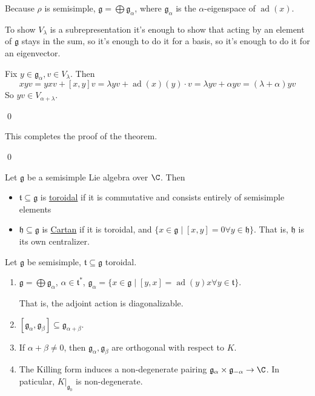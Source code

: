 \documentclass[x11names,reqno,14pt]{extarticle}
\newcommand{\mk}[1]{\mathfrak{#1}}
\newcommand{\g}{\mk{g}}
\newcommand{\h}{\mk{h}}
\DeclareMathOperator{\ad}{ad}
\begin{document}
Because $\rho$ is semisimple, $\g = \bigoplus \g_\alpha$, where $\g_\alpha$ is the $\alpha$-eigenspace of $\ad(x)$. 

To show $V_\lambda$ is a subrepresentation it's enough to show that acting by an element of $\g$ stays in the sum, so it's enough to do it for a basis, so it's enough to do it for an eigenvector. 

Fix $y \in \g_\alpha, v \in V_\lambda$. Then 
\[
xyv = yxv + [x,y]v = \lambda yv + \ad(x)(y)\cdot v = \lambda yv + \alpha yv = (\lambda + \alpha)yv
\]
So $yv \in V_{\alpha + \lambda}$. 

\qed

This completes the proof of the theorem. 

\qed


Let $\g$ be a semisimple Lie algebra over $\C$. Then
\begin{itemize}

\item $\mk{t}\subseteq\g$ is \underline{toroidal} if it is commutative and consists entirely of semisimple elements 

\item $\h\subseteq\g$ is \underline{Cartan} if it is toroidal, and $\{x\in\g\mid [x,y] = 0 \forall y \in \h\}$. That is, $\h$ is its own centralizer. 

\end{itemize}

\thm

Let $\g$ be semisimple, $\mk{t}\subseteq\g$ toroidal. 
\begin{enumerate}

\item $\g = \bigoplus \g_\alpha$, $\alpha \in \mk{t}^*$, $\g_\alpha = \{x \in \g \mid [y,x] = \ad(y)x \forall y \in \mk{t}\}$. 

That is, the adjoint action is diagonalizable. 

\item $[\g_\alpha, \g_\beta]\subseteq\g_{\alpha+\beta}$. 

\item If $\alpha+\beta \neq 0$, then $\g_\alpha,\g_\beta$ are orthogonal with respect to $K$. 

\item The Killing form induces a non-degenerate pairing $\g_\alpha \times \g_{-\alpha}\to\C$. In paticular, $K|_{\g_0}$ is non-degenerate.

\end{enumerate}
\end{document}

